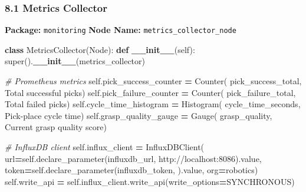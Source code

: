 \documentclass[
]{article}
\newenvironment{Shaded}{\begin{snugshade}}{\end{snugshade}}
\newcommand{\BuiltInTok}[1]{#1}
\newcommand{\CommentTok}[1]{\textcolor[rgb]{0.56,0.35,0.01}{\textit{#1}}}
\newcommand{\FunctionTok}[1]{\textcolor[rgb]{0.13,0.29,0.53}{\textbf{#1}}}
\newcommand{\KeywordTok}[1]{\textcolor[rgb]{0.13,0.29,0.53}{\textbf{#1}}}
\newcommand{\NormalTok}[1]{#1}
\newcommand{\OperatorTok}[1]{\textcolor[rgb]{0.81,0.36,0.00}{\textbf{#1}}}
\newcommand{\StringTok}[1]{\textcolor[rgb]{0.31,0.60,0.02}{#1}}
\newcommand{\VariableTok}[1]{\textcolor[rgb]{0.00,0.00,0.00}{#1}}
\begin{document}
\hypertarget{metrics-collector}{%
\subsubsection{8.1 Metrics Collector}\label{metrics-collector}}

\textbf{Package:} \texttt{monitoring} \textbf{Node Name:}
\texttt{metrics\_collector\_node}

\begin{Shaded}
\begin{Highlighting}[]
\KeywordTok{class}\NormalTok{ MetricsCollector(Node):}
    \KeywordTok{def} \FunctionTok{\_\_init\_\_}\NormalTok{(}\VariableTok{self}\NormalTok{):}
        \BuiltInTok{super}\NormalTok{().}\FunctionTok{\_\_init\_\_}\NormalTok{(}\StringTok{\textquotesingle{}metrics\_collector\textquotesingle{}}\NormalTok{)}

        \CommentTok{\# Prometheus metrics}
        \VariableTok{self}\NormalTok{.pick\_success\_counter }\OperatorTok{=}\NormalTok{ Counter(}
            \StringTok{\textquotesingle{}pick\_success\_total\textquotesingle{}}\NormalTok{, }\StringTok{\textquotesingle{}Total successful picks\textquotesingle{}}\NormalTok{)}
        \VariableTok{self}\NormalTok{.pick\_failure\_counter }\OperatorTok{=}\NormalTok{ Counter(}
            \StringTok{\textquotesingle{}pick\_failure\_total\textquotesingle{}}\NormalTok{, }\StringTok{\textquotesingle{}Total failed picks\textquotesingle{}}\NormalTok{)}
        \VariableTok{self}\NormalTok{.cycle\_time\_histogram }\OperatorTok{=}\NormalTok{ Histogram(}
            \StringTok{\textquotesingle{}cycle\_time\_seconds\textquotesingle{}}\NormalTok{, }\StringTok{\textquotesingle{}Pick{-}place cycle time\textquotesingle{}}\NormalTok{)}
        \VariableTok{self}\NormalTok{.grasp\_quality\_gauge }\OperatorTok{=}\NormalTok{ Gauge(}
            \StringTok{\textquotesingle{}grasp\_quality\textquotesingle{}}\NormalTok{, }\StringTok{\textquotesingle{}Current grasp quality score\textquotesingle{}}\NormalTok{)}

        \CommentTok{\# InfluxDB client}
        \VariableTok{self}\NormalTok{.influx\_client }\OperatorTok{=}\NormalTok{ InfluxDBClient(}
\NormalTok{            url}\OperatorTok{=}\VariableTok{self}\NormalTok{.declare\_parameter(}\StringTok{\textquotesingle{}influxdb\_url\textquotesingle{}}\NormalTok{, }\StringTok{\textquotesingle{}http://localhost:8086\textquotesingle{}}\NormalTok{).value,}
\NormalTok{            token}\OperatorTok{=}\VariableTok{self}\NormalTok{.declare\_parameter(}\StringTok{\textquotesingle{}influxdb\_token\textquotesingle{}}\NormalTok{, }\StringTok{\textquotesingle{}\textquotesingle{}}\NormalTok{).value,}
\NormalTok{            org}\OperatorTok{=}\StringTok{\textquotesingle{}robotics\textquotesingle{}}\NormalTok{)}
        \VariableTok{self}\NormalTok{.write\_api }\OperatorTok{=} \VariableTok{self}\NormalTok{.influx\_client.write\_api(write\_options}\OperatorTok{=}\NormalTok{SYNCHRONOUS)}


\end{Highlighting}
\end{Shaded}
\end{document}
